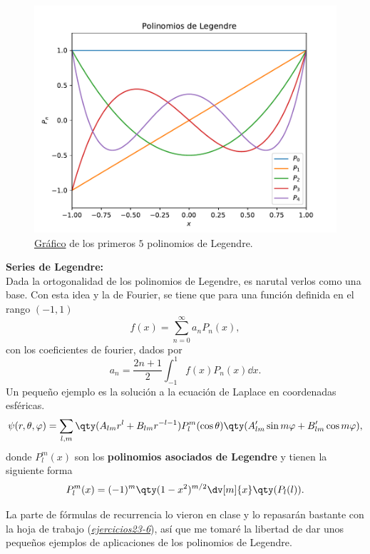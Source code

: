 \begin{figure}[H]
	\centering
	\includegraphics[scale=0.65]{./img/polinomiosLegendre.pdf}
	\caption{\href{https://github.com/DSarceno/Other/blob/main/Stuff/pLegrende.py}{Gráfico} de los primeros $5$ polinomios de Legendre.}
\end{figure}




\begin{mdframed}[style=warning]
	{\Large \textbf{Series de Legendre:}} \\
	Dada la ortogonalidad de los polinomios de Legendre, es narutal verlos como una base. Con esta idea y la de Fourier, se tiene que para una función definida en el rango $(-1,1)$
		$$ f(x) = \sum _{n = 0} ^\infty a_n P_n (x), $$
	con los coeficientes de fourier, dados por
		$$ a_n = \frac{2n + 1}{2} \int _{-1} ^1 f(x) P_n (x) \dd{x}. $$
	Un pequeño ejemplo es la solución a la ecuación de Laplace en coordenadas esféricas.
\begin{equation}
	\psi (r,\theta ,\varphi) = \sum _{l,m} \qty(A_{lm} r^l + B_{lm} r^{-l-1}) P_l ^m (\cos{\theta}) \qty(A_{lm} ' \sin{m\varphi} + B_{lm} ' \cos{m\varphi}) , \label{sollaplace}
\end{equation}
	donde $P_l ^m (x)$ son los \textbf{polinomios asociados de Legendre} y tienen la siguiente forma
		$$ P_l ^m (x) = (-1)^m \qty(1 - x^2)^{m/2} \dv[m]{x} \qty(P_l (l)). $$
\end{mdframed}




La parte de fórmulas de recurrencia lo vieron en clase y lo repasarán bastante con la hoja de trabajo (\href{https://github.com/DSarceno/Auxiliatura/tree/main/Metodos\%20Matematicos/Hojas}{\textit{ejercicios23-6}}), así que me tomaré la libertad de dar unos pequeños ejemplos de aplicaciones de los polinomios de Legendre.



